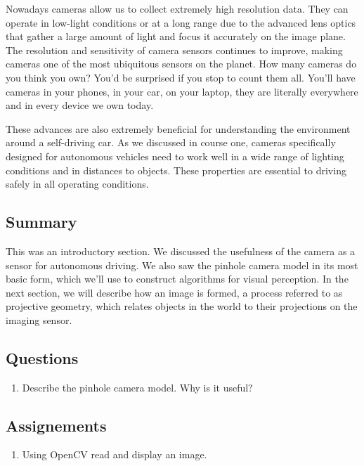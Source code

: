 Nowadays  cameras allow us to collect extremely high resolution data. They can operate in
low-light conditions or at a long range due to the advanced lens optics
that gather a large amount of light and focus it
accurately on the image plane. The resolution and sensitivity of camera sensors
continues to improve, making cameras one of the most ubiquitous sensors on the planet. How many cameras do
you think you own? You'd be surprised if you
stop to count them all. You'll have cameras in
your phones, in your car, on your laptop,
they are literally everywhere and in
every device we own today. 

These advances are also
extremely beneficial for understanding the environment
around a self-driving car. As we discussed in course one, cameras specifically designed for autonomous vehicles need to work well in a wide range of lighting conditions and
in distances to objects. These properties are
essential to driving safely in all
operating conditions. 


\subsection{Summary}

This was an introductory section. We discussed the usefulness of the camera as a sensor
for autonomous driving. We also saw the pinhole
camera model in its most basic form, which we'll use
to construct algorithms for visual perception. In the next section, we will describe how an image is formed, a process referred to
as projective geometry, which relates objects in the world to their projections on the imaging sensor.

\subsection{Questions}

\begin{enumerate}
\item Describe the pinhole camera model. Why is it useful?
\end{enumerate}

\subsection{Assignements}

\begin{enumerate}
\item Using OpenCV read and display an image.
\end{enumerate}

